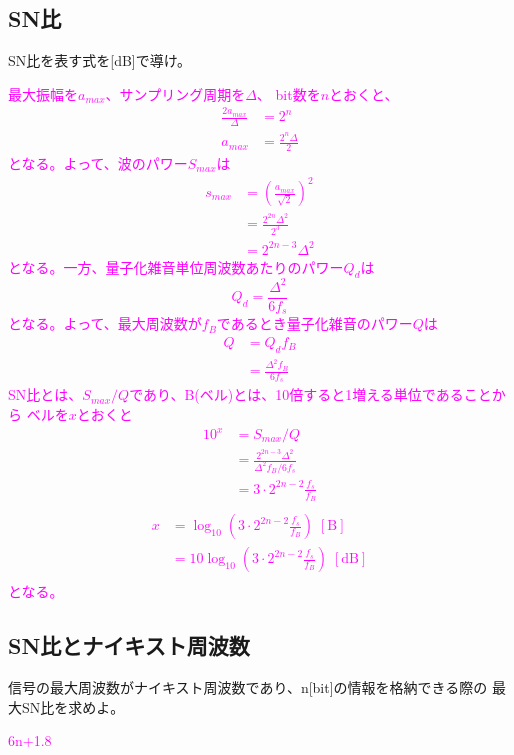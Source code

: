 \documentclass[twocolumn]{ltjsarticle}
\newcommand{\visible}{visible}
\newcommand{\ans}[1]{
\begin{tcolorbox}[\visible]
\textcolor{magenta}{#1}
\end{tcolorbox}
}
\begin{document}
\subsection{SN比}
SN比を表す式を[dB]で導け。
\ans{
    最大振幅を$a_{max}$、サンプリング周期を$\Delta$、
    bit数を$n$とおくと、
    \begin{align*}
        \frac{2a_{max}}{\Delta}&=2^n\\
        a_{max}&=\frac{2^n\Delta}{2}
    \end{align*}
    となる。よって、波のパワー$S_{max}$は
    \begin{align*}
        s_{max}&=\left(\frac{a_{max}}{\sqrt{2}}\right)^2\\
        &=\frac{2^{2n}\Delta^2}{2^3}\\
        &=2^{2n-3}\Delta^2
    \end{align*}
    となる。一方、量子化雑音単位周波数あたりのパワー$Q_d$は
    $$Q_d=\frac{\Delta^2}{6f_s}$$
    となる。よって、最大周波数が$f_B$であるとき量子化雑音のパワー$Q$は
    \begin{align*}
        Q&=Q_df_B\\
        &=\frac{\Delta^2f_B}{6f_s}
    \end{align*}
    SN比とは、$S_{max}/Q$であり、B(ベル)とは、10倍すると1増える単位であることから
    ベルを$x$とおくと
    \begin{align*}
        10^x&=S_{max}/Q\\
        &=\frac{2^{2n-3}\Delta^2}{{\Delta^2f_B}/{6f_s}}\\
        &=3\cdot2^{2n-2}\frac{f_s}{f_B}\\
    \end{align*}
    \begin{align*}
        x&=\log_{10}\left(3\cdot2^{2n-2}\frac{f_s}{f_B}\right) \; [\mathrm{B}]\\
        &=10\log_{10}\left(3\cdot2^{2n-2}\frac{f_s}{f_B}\right) \; [\mathrm{dB}]\\
    \end{align*}
    となる。
}
\subsection{SN比とナイキスト周波数}
信号の最大周波数がナイキスト周波数であり、n[bit]の情報を格納できる際の
最大SN比を求めよ。
\ans{
    6n+1.8
}

\nocite{*}
\printbibliography
\end{document}
